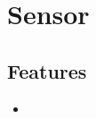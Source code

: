 \section{Sensor}
\label{module:Sensor}
\ClearAPI
\TODO
\subsection{Features}
\begin{itemize}
	\item \TODO
\end{itemize}

